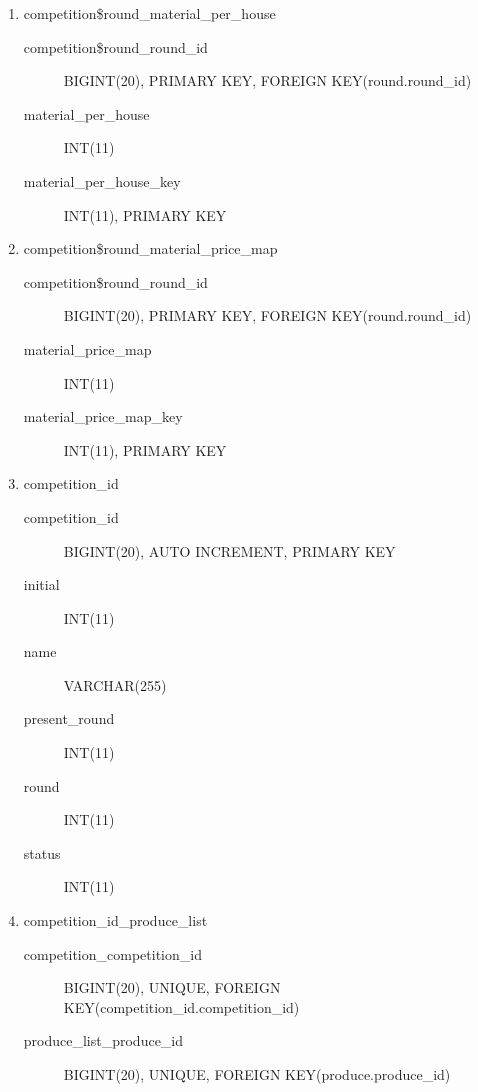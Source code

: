 \documentclass{article}
\begin{document}
{\begin{enumerate}
    \begin{description}
      \item[competition\$round\_round\_id] BIGINT(20), PRIMARY KEY, FOREIGN KEY(round.round\_id)
      \item[machine\_start\_price\_map] INT(11)
      \item[machine\_start\_price\_map\_key] INT(11), PRIMARY KEY
    \end{description}
  \item competition\$round\_material\_per\_house
    \begin{description}
      \item[competition\$round\_round\_id] BIGINT(20), PRIMARY KEY, FOREIGN KEY(round.round\_id)
      \item[material\_per\_house] INT(11)
      \item[material\_per\_house\_key] INT(11), PRIMARY KEY
    \end{description}
  \item competition\$round\_material\_price\_map
    \begin{description}
      \item[competition\$round\_round\_id] BIGINT(20), PRIMARY KEY, FOREIGN KEY(round.round\_id)
      \item[material\_price\_map] INT(11)
      \item[material\_price\_map\_key] INT(11), PRIMARY KEY
    \end{description}
  \item competition\_id
    \begin{description}
      \item[competition\_id] BIGINT(20), AUTO INCREMENT, PRIMARY KEY
      \item[initial] INT(11)
      \item[name] VARCHAR(255)
      \item[present\_round] INT(11)
      \item[round] INT(11)
      \item[status] INT(11)
    \end{description}
  \item competition\_id\_produce\_list
    \begin{description}
      \item[competition\_competition\_id] BIGINT(20), UNIQUE, FOREIGN KEY(competition\_id.competition\_id)
      \item[produce\_list\_produce\_id] BIGINT(20), UNIQUE, FOREIGN KEY(produce.produce\_id)
    \end{description}

\end{enumerate}}
\end{document}
